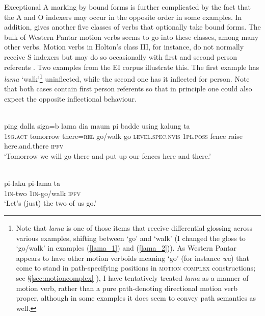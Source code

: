 Exceptional A marking by bound forms is further complicated by the fact that the A and O indexers may occur in the opposite order in some examples. In addition, \citet{holton2010person} gives another five classes of verbs that optionally take bound forms. The bulk of Western Pantar motion verbs seems to go into these classes, among many other verbs. Motion verbs in Holton's class III, for instance, do not normally receive S indexers but may do so occasionally with first and second person referents \citep[109]{holton2010person}. Two examples from the EI corpus illustrate this. The first example has \textit{lama} `walk'\footnote{Note that \textit{lama} is one of those items that receive differential glossing across various examples, shifting between `go' and `walk' (I changed the gloss to `go/walk' in examples (\ref{lama_1}) and (\ref{lama_2})). As Western Pantar appears to have other motion verboids meaning `go' (for instance \textit{wa}) that come to stand in path-specifying positions in \textsc{motion complex} constructions; see §\ref{sec:motioncomplex}
), I have tentatively treated \textit{lama} as a manner of motion verb, rather than a pure path-denoting directional motion verb proper, although in some examples it does seem to convey path semantics as well.} uninflected, while the second one has it inflected for person. Note that both cases contain first person referents so that in principle one could also expect the opposite inflectional behaviour.

\ea \label{lama_1}
\\
\gll ping dalla siga=b lama dia maum pi badde using kalung ta \\
1\textsc{sg}.\textsc{act} tomorrow there=\textsc{rel} go/walk go \textsc{level.spec.nvis} 1\textsc{pl}.\textsc{poss} fence raise here.and.there \textsc{ipfv} \\
\glft `Tomorrow we will go there and put up our fences here and there.'\\ 
\z

\ea \label{lama_2}
\\
\gll pi-laku pi-lama ta \\
1\textsc{in}-two 1\textsc{in}-go/walk \textsc{ipfv} \\
\glft `Let's (just) the two of us go.'\\ 
\z

